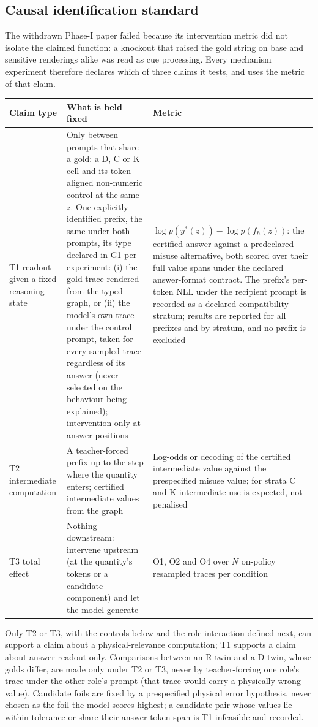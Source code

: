 \documentclass[10pt,a4paper]{article}
\begin{document}
\subsection{Causal identification standard}
\label{sec:causal}

The withdrawn Phase-I paper failed because its intervention metric did not isolate the claimed function: a
knockout that raised the gold string on base and sensitive renderings alike was read as cue processing. Every
mechanism experiment therefore declares which of three claims it tests, and uses the metric of that claim.

\begin{center}\small
\begin{tabularx}{\linewidth}{@{}P{3.2cm}LL@{}}
\toprule
Claim type & What is held fixed & Metric \\
\midrule
T1 readout given a fixed reasoning state & Only between prompts that share a gold: a D, C or K cell and its token-aligned non-numeric control at the same $z$. One explicitly identified prefix, the same under both prompts, its type declared in G1 per experiment: (i) the gold trace rendered from the typed graph, or (ii) the model's own trace under the control prompt, taken for every sampled trace regardless of its answer (never selected on the behaviour being explained); intervention only at answer positions & $\log p(y^*(z))-\log p(f_h(z))$: the certified answer against a predeclared misuse alternative, both scored over their full value spans under the declared answer-format contract. The prefix's per-token NLL under the recipient prompt is recorded as a declared compatibility stratum; results are reported for all prefixes and by stratum, and no prefix is excluded \\
T2 intermediate computation & A teacher-forced prefix up to the step where the quantity enters; certified intermediate values from the graph & Log-odds or decoding of the certified intermediate value against the prespecified misuse value; for strata C and K intermediate use is expected, not penalised \\
T3 total effect & Nothing downstream: intervene upstream (at the quantity's tokens or a candidate component) and let the model generate & O1, O2 and O4 over $N$ on-policy resampled traces per condition \\
\bottomrule
\end{tabularx}
\end{center}

Only T2 or T3, with the controls below and the role interaction defined next, can support a claim about a
physical-relevance computation; T1 supports a claim about answer readout only. Comparisons between an R twin and a D twin, whose golds differ, are made only
under T2 or T3, never by teacher-forcing one role's trace under the other role's prompt (that trace would carry a
physically wrong value). Candidate foils are fixed by a prespecified physical error hypothesis, never chosen as the
foil the model scores highest; a candidate pair whose values lie within tolerance or share their answer-token span
is T1-infeasible and recorded.
\end{document}

